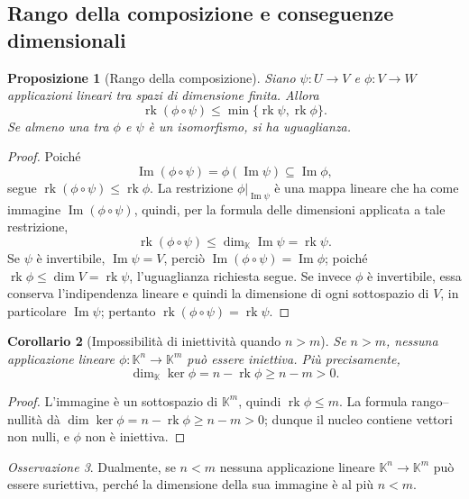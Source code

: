 \documentclass[11pt,a4paper]{article}
\newcommand{\KK}{\mathbb{K}}
\theoremstyle{plain}
\newtheorem{prop}{Proposizione}[section]
\newtheorem{cor}[prop]{Corollario}
\theoremstyle{definition}
\theoremstyle{remark}
\newtheorem{oss}[prop]{Osservazione}
\begin{document}
\subsection{Rango della composizione e conseguenze dimensionali}

\begin{prop}[Rango della composizione]
Siano $\psi:U\to V$ e $\phi:V\to W$ applicazioni lineari tra
spazi di dimensione finita. Allora
\[
 \operatorname{rk}(\phi\circ\psi)
 \leq\min\{\operatorname{rk}\psi,\operatorname{rk}\phi\}.
\]
Se almeno una tra $\phi$ e $\psi$ è un isomorfismo, si ha uguaglianza.
\end{prop}
\begin{proof}
Poiché
\[
 \operatorname{Im}(\phi\circ\psi)
 =\phi(\operatorname{Im}\psi)\subseteq\operatorname{Im}\phi,
\]
segue $\operatorname{rk}(\phi\circ\psi)\leq\operatorname{rk}\phi$.
La restrizione $\phi|_{\operatorname{Im}\psi}$ è una mappa lineare
che ha come immagine $\operatorname{Im}(\phi\circ\psi)$, quindi,
per la formula delle dimensioni applicata a tale restrizione,
\[
 \operatorname{rk}(\phi\circ\psi)
 \leq\dim_{\KK}\operatorname{Im}\psi
 =\operatorname{rk}\psi.
\]
Se $\psi$ è invertibile, $\operatorname{Im}\psi=V$, perciò
$\operatorname{Im}(\phi\circ\psi)=\operatorname{Im}\phi$;
poiché $\operatorname{rk}\phi\leq\dim V=\operatorname{rk}\psi$,
l'uguaglianza richiesta segue.
Se invece $\phi$ è invertibile, essa conserva l'indipendenza lineare
e quindi la dimensione di ogni sottospazio di $V$, in particolare
$\operatorname{Im}\psi$; pertanto
$\operatorname{rk}(\phi\circ\psi)=\operatorname{rk}\psi$.
\end{proof}

\begin{cor}[Impossibilità di iniettività quando $n>m$]
Se $n>m$, nessuna applicazione lineare
$\phi:\KK^n\to\KK^m$ può essere iniettiva. Più precisamente,
\[
 \dim_{\KK}\ker\phi
 =n-\operatorname{rk}\phi\geq n-m>0.
\]
\end{cor}
\begin{proof}
L'immagine è un sottospazio di $\KK^m$, quindi
$\operatorname{rk}\phi\leq m$.
La formula rango--nullità dà
$\dim\ker\phi=n-\operatorname{rk}\phi\geq n-m>0$;
dunque il nucleo contiene vettori non nulli, e $\phi$ non è iniettiva.
\end{proof}

\begin{oss}
Dualmente, se $n<m$ nessuna applicazione lineare
$\KK^n\to\KK^m$ può essere suriettiva, perché la dimensione
della sua immagine è al più $n<m$.
\end{oss}
\end{document}
